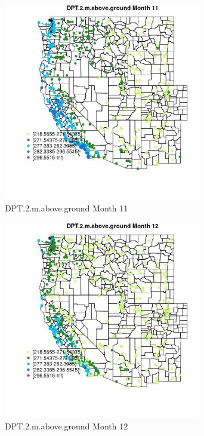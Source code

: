\begin{figure} 
\centering  
\includegraphics[width=0.77\textwidth]{Code_Outputs/Report_ML_input_PM25_Step4_part_e_de_duplicated_aves_compiled_2019-05-14wNAs_MapObsMo11DPT2maboveground.jpg} 
\caption{\label{fig:Report_ML_input_PM25_Step4_part_e_de_duplicated_aves_compiled_2019-05-14wNAsMapObsMo11DPT2maboveground}DPT.2.m.above.ground Month 11} 
\end{figure} 
 

\clearpage 

\begin{figure} 
\centering  
\includegraphics[width=0.77\textwidth]{Code_Outputs/Report_ML_input_PM25_Step4_part_e_de_duplicated_aves_compiled_2019-05-14wNAs_MapObsMo12DPT2maboveground.jpg} 
\caption{\label{fig:Report_ML_input_PM25_Step4_part_e_de_duplicated_aves_compiled_2019-05-14wNAsMapObsMo12DPT2maboveground}DPT.2.m.above.ground Month 12} 
\end{figure} 
 

